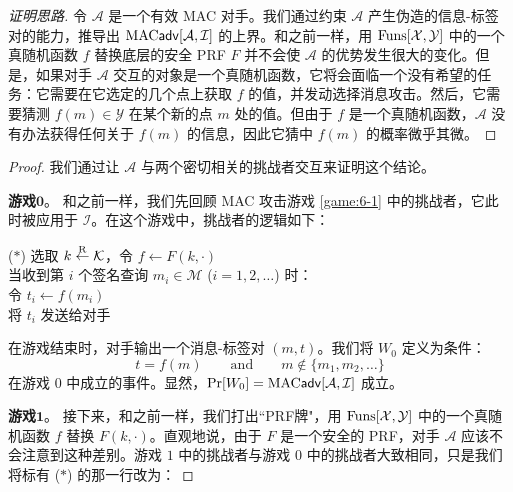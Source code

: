 \begin{proof}[证明思路]
令 $\mathcal{A}$ 是一个有效 MAC 对手。我们通过约束 $\mathcal{A}$ 产生伪造的信息-标签对的能力，推导出 ${\rm MAC}\mathsf{adv}[\mathcal{A},\mathcal{I}]$ 的上界。和之前一样，用 ${\rm Funs}[\mathcal{X},\mathcal{Y}]$ 中的一个真随机函数 $f$ 替换底层的安全 PRF $F$ 并不会使 $\mathcal{A}$ 的优势发生很大的变化。但是，如果对手 $\mathcal{A}$ 交互的对象是一个真随机函数，它将会面临一个没有希望的任务：它需要在它选定的几个点上获取 $f$ 的值，并发动选择消息攻击。然后，它需要猜测 $f(m)\in\mathcal{Y}$ 在某个新的点 $m$ 处的值。但由于 $f$ 是一个真随机函数，$\mathcal{A}$ 没有办法获得任何关于 $f(m)$ 的信息，因此它猜中 $f(m)$ 的概率微乎其微。
\end{proof}

\begin{proof}
我们通过让 $\mathcal{A}$ 与两个密切相关的挑战者交互来证明这个结论。

\vspace{5pt}

\noindent\textbf{游戏$\mathbf{0}$}。
和之前一样，我们先回顾 MAC 攻击游戏 \ref{game:6-1} 中的挑战者，它此时被应用于 $\mathcal{I}$。在这个游戏中，挑战者的逻辑如下：

\vspace{5pt}

\hspace*{-16.5pt} ($*$)
\hspace*{1pt} 选取 $k\overset{\rm R}\leftarrow\mathcal{K}$，令 $f\leftarrow F(k,\cdot)$\\
\hspace*{26pt} 当收到第 $i$ 个签名查询 $m_i\in\mathcal{M}$ ($i=1,2,\dots$) 时：\\
\hspace*{50pt} 令 $t_i\leftarrow f(m_i)$\\
\hspace*{50pt} 将 $t_i$ 发送给对手

\vspace{5pt}

\noindent
在游戏结束时，对手输出一个消息-标签对 $(m,t)$。我们将 $W_0$ 定义为条件：
\begin{equation}\label{eq:6-5}
t=f(m)
\quad\quad\text{and}\quad\quad
m\notin\{m_1,m_2,\dots\}
\end{equation}
在游戏 $0$ 中成立的事件。显然，$\Pr[W_0]={\rm MAC}\mathsf{adv}[\mathcal{A},\mathcal{I}]$ 成立。

\vspace{5pt}

\noindent\textbf{游戏$\mathbf{1}$}。
接下来，和之前一样，我们打出``PRF牌"，用 ${\rm Funs}[\mathcal{X},\mathcal{Y}]$ 中的一个真随机函数 $f$ 替换 $F(k,\cdot)$。直观地说，由于 $F$ 是一个安全的 PRF，对手 $\mathcal{A}$ 应该不会注意到这种差别。游戏 $1$ 中的挑战者与游戏 $0$ 中的挑战者大致相同，只是我们将标有 ($*$) 的那一行改为：


\end{proof}

